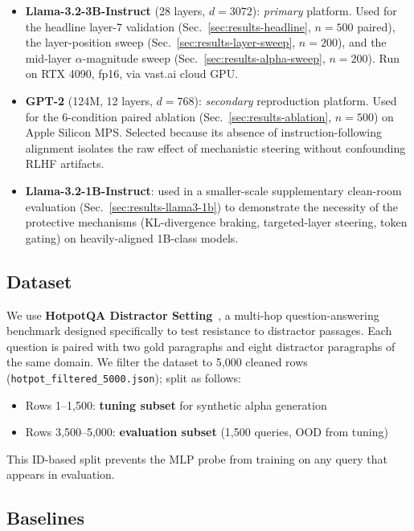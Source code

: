 \documentclass[conference]{IEEEtran}
\begin{document}
\begin{itemize}
    \item \textbf{Llama-3.2-3B-Instruct} (28 layers, $d\!=\!3072$): \emph{primary} platform. Used for the headline layer-7 validation (Sec.~\ref{sec:results-headline}, $n\!=\!500$ paired), the layer-position sweep (Sec.~\ref{sec:results-layer-sweep}, $n\!=\!200$), and the mid-layer $\alpha$-magnitude sweep (Sec.~\ref{sec:results-alpha-sweep}, $n\!=\!200$). Run on RTX 4090, fp16, via vast.ai cloud GPU.
    \item \textbf{GPT-2} (124M, 12 layers, $d\!=\!768$): \emph{secondary} reproduction platform. Used for the 6-condition paired ablation (Sec.~\ref{sec:results-ablation}, $n\!=\!500$) on Apple Silicon MPS. Selected because its absence of instruction-following alignment isolates the raw effect of mechanistic steering without confounding RLHF artifacts.
    \item \textbf{Llama-3.2-1B-Instruct}: used in a smaller-scale supplementary clean-room evaluation (Sec.~\ref{sec:results-llama3-1b}) to demonstrate the necessity of the protective mechanisms (KL-divergence braking, targeted-layer steering, token gating) on heavily-aligned 1B-class models.
\end{itemize}

\subsection{Dataset}

We use \textbf{HotpotQA Distractor Setting}~\cite{yang2018hotpotqa}, a multi-hop question-answering benchmark designed specifically to test resistance to distractor passages. Each question is paired with two gold paragraphs and eight distractor paragraphs of the same domain. We filter the dataset to 5{,}000 cleaned rows (\texttt{hotpot\_filtered\_5000.json}); split as follows:
\begin{itemize}
    \item Rows 1--1{,}500: \textbf{tuning subset} for synthetic alpha generation
    \item Rows 3{,}500--5{,}000: \textbf{evaluation subset} (1{,}500 queries, OOD from tuning)
\end{itemize}
This ID-based split prevents the MLP probe from training on any query that appears in evaluation.

\subsection{Baselines}
\end{document}
